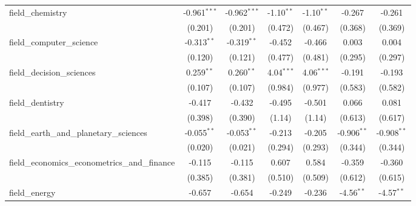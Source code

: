 \begin{tabular}{lcccccc}
   field\_chemistry                                            & -0.961$^{***}$ & -0.962$^{***}$ & -1.10$^{**}$   & -1.10$^{**}$   & -0.267         & -0.261\\   
                                                               & (0.201)        & (0.201)        & (0.472)        & (0.467)        & (0.368)        & (0.369)\\   
   field\_computer\_science                                    & -0.313$^{**}$  & -0.319$^{**}$  & -0.452         & -0.466         & 0.003          & 0.004\\   
                                                               & (0.120)        & (0.121)        & (0.477)        & (0.481)        & (0.295)        & (0.297)\\   
   field\_decision\_sciences                                   & 0.259$^{**}$   & 0.260$^{**}$   & 4.04$^{***}$   & 4.06$^{***}$   & -0.191         & -0.193\\   
                                                               & (0.107)        & (0.107)        & (0.984)        & (0.977)        & (0.583)        & (0.582)\\   
   field\_dentistry                                            & -0.417         & -0.432         & -0.495         & -0.501         & 0.066          & 0.081\\   
                                                               & (0.398)        & (0.390)        & (1.14)         & (1.14)         & (0.613)        & (0.617)\\   
   field\_earth\_and\_planetary\_sciences                      & -0.055$^{**}$  & -0.053$^{**}$  & -0.213         & -0.205         & -0.906$^{**}$  & -0.908$^{**}$\\   
                                                               & (0.020)        & (0.021)        & (0.294)        & (0.293)        & (0.344)        & (0.344)\\   
   field\_economics\_econometrics\_and\_finance                & -0.115         & -0.115         & 0.607          & 0.584          & -0.359         & -0.360\\   
                                                               & (0.385)        & (0.381)        & (0.510)        & (0.509)        & (0.612)        & (0.615)\\   
   field\_energy                                               & -0.657         & -0.654         & -0.249         & -0.236         & -4.56$^{**}$   & -4.57$^{**}$\\   

\end{tabular}
